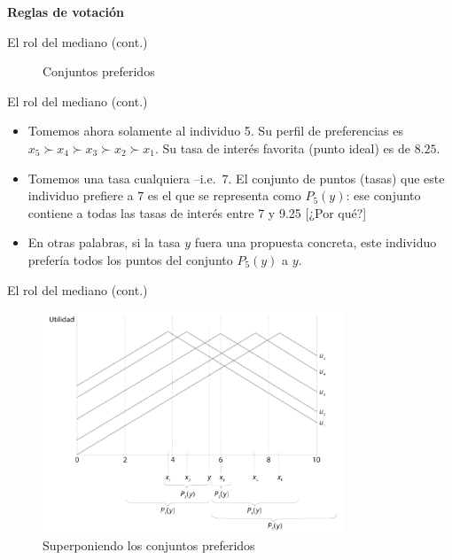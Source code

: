 \documentclass[
  ignorenonframetext,
]{beamer}
\providecommand{\tightlist}{%
  \setlength{\itemsep}{0pt}\setlength{\parskip}{0pt}}\usepackage{longtable,booktabs,array}
\begin{document}
\begin{frame}{\textbf{Reglas de votación}}
\begin{block}{El rol del mediano (cont.)}
\begin{figure}
\caption{Conjuntos preferidos}

\end{figure}
\end{block}

\begin{block}{El rol del mediano (cont.)}
\protect\hypertarget{el-rol-del-mediano-cont.-2}{}
\begin{itemize}
\tightlist
\item
  Tomemos ahora solamente al individuo 5. Su perfil de preferencias es
  \(x_5 \succ x_4 \succ x_3 \succ x_2 \succ x_1\). Su tasa de interés
  favorita (punto ideal) es de \(8.25\).
\item
  Tomemos una tasa cualquiera --i.e.~\(7\). El conjunto de puntos
  (tasas) que este individuo prefiere a \(7\) es el que se representa
  como \(P_5(y)\): ese conjunto contiene a todas las tasas de interés
  entre 7 y 9.25 {[}¿Por qué?{]}
\item
  En otras palabras, si la tasa \(y\) fuera una propuesta concreta, este
  individuo prefería todos los puntos del conjunto \(P_5(y)\) a \(y\).
\end{itemize}
\end{block}

\begin{block}{El rol del mediano (cont.)}
\protect\hypertarget{el-rol-del-mediano-cont.-3}{}
\begin{figure}

{\centering \includegraphics[width=0.8\textwidth,height=\textheight]{../epol/fig/fig-02-008.png}

}

\caption{Superponiendo los conjuntos preferidos}

\end{figure}
\end{block}


\end{frame}
\end{document}
